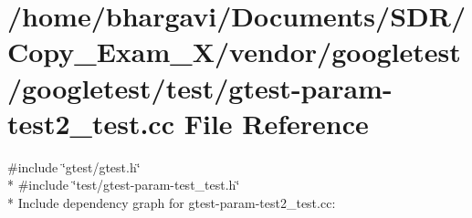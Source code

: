 \hypertarget{gtest-param-test2__test_8cc}{}\section{/home/bhargavi/\+Documents/\+S\+D\+R/\+Copy\+\_\+\+Exam\+\_\+X/vendor/googletest/googletest/test/gtest-\/param-\/test2\+\_\+test.cc File Reference}
\label{gtest-param-test2__test_8cc}
{\ttfamily \#include \char`\"{}gtest/gtest.\+h\char`\"{}}\\*
{\ttfamily \#include \char`\"{}test/gtest-\/param-\/test\+\_\+test.\+h\char`\"{}}\\*
Include dependency graph for gtest-\/param-\/test2\+\_\+test.cc\+:
